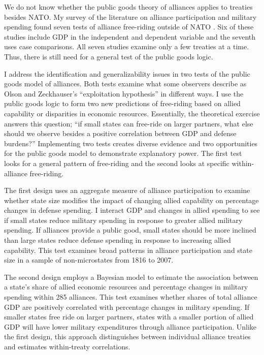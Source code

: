 \documentclass[12pt]{article}
\begin{document}
We do not know whether the public goods theory of alliances applies to treaties besides NATO. 
My survey of the literature on alliance participation and military spending found seven tests of alliance free-riding outside of NATO \citep{Russett1970, Starr1974, Reisinger1983, Thies1987, ConybeareSandler1990, OnealWhatley1996, Siroky2012}. 
Six of these studies include GDP in the independent and dependent variable and the seventh uses case comparisons.
All seven studies examine only a few treaties at a time. 
Thus, there is still need for a general test of the public goods logic. 


I address the identification and generalizability issues in two tests of the public goods model of alliances.  
Both tests examine what some observers describe as Olson and Zeckhauser's ``exploitation hypothesis'' in different ways.   
I use the public goods logic to form two new predictions of free-riding based on allied capability or disparities in economic resources.
Essentially, the theoretical exercise answers this question; ``if small states can free-ride on larger partners, what else should we observe besides a positive correlation between GDP and defense burdens?'' 
Implementing two tests creates diverse evidence and two opportunities for the public goods model to demonstrate explanatory power. 
The first test looks for a general pattern of free-riding and the second looks at specific within-alliance free-riding. 


The first design uses an aggregate measure of alliance participation to examine whether state size modifies the impact of changing allied capability on percentage changes in defense spending.
I interact GDP and changes in allied spending to see if small states reduce military spending in response to greater allied military spending. 
If alliances provide a public good, small states should be more inclined than large states reduce defense spending in response to increasing allied capability. 
This test examines broad patterns in alliance participation and state size in a sample of non-microstates from 1816 to 2007. 


The second design employs a Bayesian model to estimate the association between a state's share of allied economic resources and percentage changes in military spending within 285 alliances. 
This test examines whether shares of total alliance GDP are positively correlated with percentage changes in military spending. 
If smaller states free ride on larger partners, states with a smaller portion of allied GDP will have lower military expenditures through alliance participation.
Unlike the first design, this approach distinguishes between individual alliance treaties and estimates within-treaty correlations. 
\end{document}
